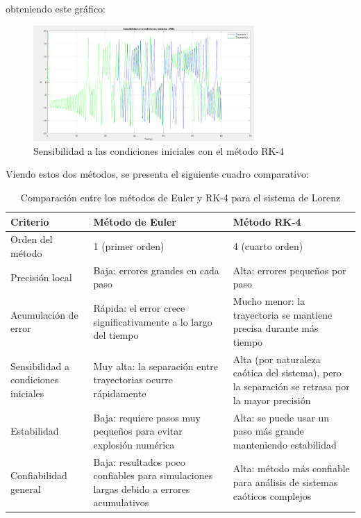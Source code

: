 \documentclass[a4paper,12pt]{article}
\theoremstyle{mytheor}
\begin{document}
obteniendo este gráfico:

\begin{figure}[H]
    \centering
    \includegraphics[width=0.75\textwidth]{g7.png}
    \caption{Sensibilidad a las condiciones iniciales con el método RK-4}
    \label{fig:sensibilidad_rk4}
\end{figure}

Viendo estos dos métodos, se presenta el siguiente cuadro comparativo:

\begin{table}[H]
\centering
\begin{tabular}{|p{3cm}|p{5cm}|p{5cm}|}
\hline
\textbf{Criterio} & \textbf{Método de Euler} & \textbf{Método RK-4} \\
\hline
Orden del método & 1 (primer orden) & 4 (cuarto orden) \\
\hline
Precisión local & Baja: errores grandes en cada paso & Alta: errores pequeños por paso \\
\hline
Acumulación de error & Rápida: el error crece significativamente a lo largo del tiempo & Mucho menor: la trayectoria se mantiene precisa durante más tiempo \\
\hline
Sensibilidad a condiciones iniciales & Muy alta: la separación entre trayectorias ocurre rápidamente & Alta (por naturaleza caótica del sistema), pero la separación se retrasa por la mayor precisión \\
\hline
Estabilidad & Baja: requiere pasos muy pequeños para evitar explosión numérica & Alta: se puede usar un paso más grande manteniendo estabilidad \\
\hline
Confiabilidad general & Baja: resultados poco confiables para simulaciones largas debido a errores acumulativos & Alta: método más confiable para análisis de sistemas caóticos complejos \\
\hline
\end{tabular}
\caption{Comparación entre los métodos de Euler y RK-4 para el sistema de Lorenz}
\label{tab:comparacion_metodos}
\end{table}
\end{document}

